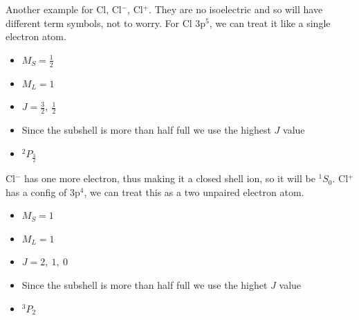 \documentclass{article}
\begin{document}
    Another example for Cl, Cl$^{-}$, Cl$^+$. They are no isoelectric and so will have different term symbols,
    not to worry. For Cl 3p$^{5}$, we can treat it like a single electron atom.
    \begin{itemize}
        \item $M_S = \frac{1}{2}$
        \item $M_L = 1$
        \item $J = \frac{3}{2},\ \frac{1}{2}$
        \item Since the subshell is more than half full we use the highest $J$ value
        \item $^2P_\frac{3}{2}$
    \end{itemize}
    Cl$^{-}$ has one more electron, thus making it a closed shell ion, so it will be $^1S_0$. 
    Cl$^{+}$ has a config of 3p$^4$, we can treat this as a two unpaired electron atom.
    \begin{itemize}
        \item $M_S = 1$
        \item $M_L = 1$
        \item $J = 2,\ 1,\ 0$
        \item Since the subshell is more than half full we use the highet $J$ value
        \item $^3P_2$
    \end{itemize}
\end{document}
